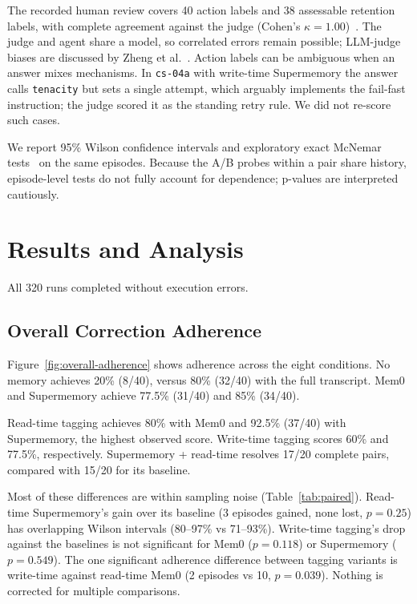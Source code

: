\documentclass[11pt,a4paper]{article}
\begin{document}
The recorded human review covers 40 action labels
and 38 assessable retention labels, with complete
agreement against the judge (Cohen's
$\kappa=1.00$)~\cite{cohen1960coefficient}.
The judge and agent share a model, so correlated
errors remain possible; LLM-judge biases are
discussed by Zheng et al.~\cite{zheng2023judging}.
Action labels can be ambiguous when an answer mixes
mechanisms. In \texttt{cs-04a} with write-time Supermemory the
answer calls \texttt{tenacity} but sets a single attempt, which
arguably implements the fail-fast instruction; the judge scored
it as the standing retry rule. We did not re-score such cases.

We report 95\% Wilson confidence intervals
\cite{wilson1927probable} and exploratory exact
McNemar tests~\cite{mcnemar1947sampling} on the
same episodes. Because the A/B probes within a
pair share history, episode-level tests do not
fully account for dependence; p-values are
interpreted cautiously.

\section{Results and Analysis}
\label{sec:results}

All 320 runs completed without execution errors.

\subsection{Overall Correction Adherence}

Figure~\ref{fig:overall-adherence} shows adherence
across the eight conditions. No memory achieves
20\% (8/40), versus 80\% (32/40) with the full
transcript. Mem0 and Supermemory achieve 77.5\%
(31/40) and 85\% (34/40).

Read-time tagging achieves 80\% with Mem0 and
92.5\% (37/40) with Supermemory, the highest
observed score. Write-time tagging scores 60\% and
77.5\%, respectively. Supermemory + read-time
resolves 17/20 complete pairs, compared with
15/20 for its baseline.

Most of these differences are within sampling noise
(Table~\ref{tab:paired}). Read-time Supermemory's
gain over its baseline (3 episodes gained, none lost,
$p=0.25$) has overlapping Wilson intervals
(80--97\% vs 71--93\%). Write-time tagging's drop
against the baselines is not significant for Mem0
($p=0.118$) or Supermemory ($p=0.549$). The one
significant adherence difference between tagging
variants is write-time against read-time Mem0
(2 episodes vs 10, $p=0.039$). Nothing is corrected
for multiple comparisons.
\end{document}
